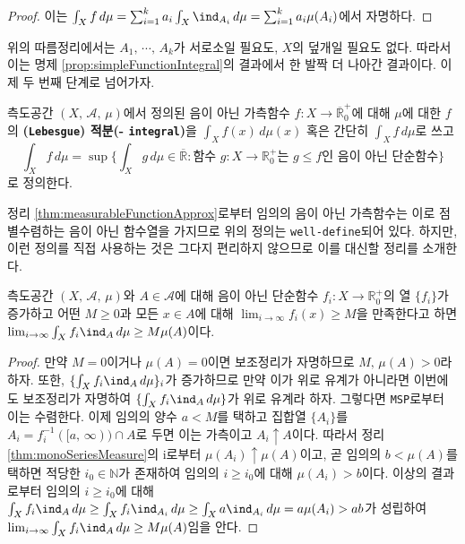 \begin{proof}
    이는 $\int_Xf\,d\mu=\sum_{i=1}^ka_i\int_X\ind_{A_i}\,d\mu=\sum_{i=1}^ka_i\mu(A_i)$에서 자명하다.
\end{proof}

위의 따름정리에서는 $A_1,\,\cdots,\,A_k$가 서로소일 필요도, $X$의 덮개일 필요도 없다. 따라서 이는 명제 \ref{prop:simpleFunctionIntegral}의 결과에서 한 발짝 더 나아간 결과이다. 이제 두 번째 단계로 넘어가자.

\begin{definition}
    측도공간 $(X,\,\mathcal{A},\,\mu)$에서 정의된 음이 아닌 가측함수 $f:X\to\overline{\mathbb{R}}^+_0$에 대해 $\mu$에 대한 $f$의 \textbf{(\texttt{Lebesgue}) 적분(- \texttt{integral})}을 $\int_Xf(x)\,d\mu(x)$ 혹은 간단히 $\int_Xf\,d\mu$로 쓰고
    \begin{equation*}
        \int_Xf\,d\mu=\sup\bigg\{\int_Xg\,d\mu\in\overline{\mathbb{R}}:\textrm{함수 $g:X\to\mathbb{R}^+_0$는 $g\leq f$인 음이 아닌 단순함수}\bigg\}
    \end{equation*}
    로 정의한다.
\end{definition}

정리 \ref{thm:measurableFunctionApprox}로부터 임의의 음이 아닌 가측함수는 이로 점별수렴하는 음이 아닌 함수열을 가지므로 위의 정의는 \texttt{well-define}되어 있다. 하지만, 이런 정의를 직접 사용하는 것은 그다지 편리하지 않으므로 이를 대신할 정리를 소개한다.

\begin{lemma}
    측도공간 $(X,\,\mathcal{A},\,\mu)$와 $A\in\mathcal{A}$에 대해 음이 아닌 단순함수 $f_i:X\to\mathbb{R}^+_0$의 열 $\{f_i\}$가 증가하고 어떤 $M\geq0$과 모든 $x\in A$에 대해 $\lim_{i\to\infty}f_i(x)\geq M$을 만족한다고 하면 $\lim_{i\to\infty}\int_Xf_i\ind_{A}\,d\mu\geq M\mu(A)$이다.
\end{lemma}

\begin{proof}
    만약 $M=0$이거나 $\mu(A)=0$이면 보조정리가 자명하므로 $M,\,\mu(A)>0$라 하자. 또한, $\{\int_Xf_i\ind_A\,d\mu\}_i$가 증가하므로 만약 이가 위로 유계가 아니라면 이번에도 보조정리가 자명하여 $\{\int_Xf_i\ind_A\,d\mu\}$가 위로 유계라 하자. 그렇다면 \texttt{MSP}로부터 이는 수렴한다. 이제 임의의 양수 $a<M$를 택하고 집합열 $\{A_i\}$를 $A_i=f_i^{-1}([a,\,\infty))\cap A$로 두면 이는 가측이고 $A_i\uparrow A$이다. 따라서 정리 \ref{thm:monoSeriesMeasure}의 i로부터 $\mu(A_i)\uparrow\mu(A)$이고, 곧 임의의 $b<\mu(A)$를 택하면 적당한 $i_0\in\mathbb{N}$가 존재하여 임의의 $i\geq i_0$에 대해 $\mu(A_i)>b$이다. 이상의 결과로부터 임의의 $i\geq i_0$에 대해 $\int_Xf_i\ind_A\,d\mu\geq\int_Xf_i\ind_{A_i}\,d\mu\geq\int_Xa\ind_{A_i}\,d\mu=a\mu(A_i)>ab$가 성립하여 $\lim_{i\to\infty}\int_Xf_i\ind_{A}\,d\mu\geq M\mu(A)$임을 안다.
\end{proof}

